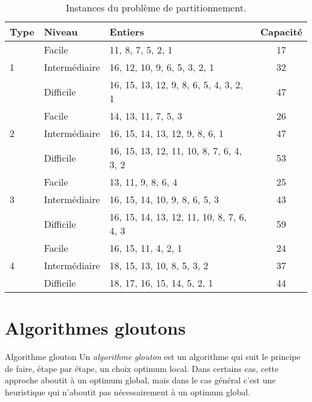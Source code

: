 \documentclass[11pt]{article}
\newcommand{\TabularInstances}[1]{%
  \begin{tabular}{lllc}
    \toprule
    Type & Niveau & Entiers & Capacité
    \ifthenelse{\equal{#1}{1} \OR \equal{#1}{0}}{%
    \\ \midrule
         & Facile & 11, 8, 7, 5, 2, 1 & 17 \\
    1 & Intermédiaire & 16, 12, 10, 9, 6, 5, 3, 2, 1 & 32 \\
         & Difficile & 16, 15, 13, 12, 9, 8, 6, 5, 4, 3, 2, 1 & 47
  }{}
  \ifthenelse{\equal{#1}{2} \OR \equal{#1}{0}}{%
    \\ \midrule
         & Facile & 14, 13, 11, 7, 5, 3 & 26 \\
    2 & Intermédiaire & 16, 15, 14, 13, 12, 9, 8, 6, 1 & 47 \\
         & Difficile & 16, 15, 13, 12, 11, 10, 8, 7, 6, 4, 3, 2 & 53
    }{}
    \ifthenelse{\equal{#1}{3} \OR \equal{#1}{0}}{%
    \\ \midrule
         & Facile & 13, 11, 9, 8, 6, 4 & 25 \\
    3 & Intermédiaire & 16, 15, 14, 10, 9, 8, 6, 5, 3 & 43 \\
         & Difficile & 16, 15, 14, 13, 12, 11, 10, 8, 7, 6, 4, 3 & 59
    }{}
    \ifthenelse{\equal{#1}{4} \OR \equal{#1}{0}}{%
    \\ \midrule
         & Facile & 16, 15, 11, 4, 2, 1 & 24 \\
    4 & Intermédiaire & 18, 15, 13, 10, 8, 5, 3, 2 & 37 \\
         & Difficile & 18, 17, 16, 15, 14, 5, 2, 1 & 44
    }{}
    \\ \bottomrule
  \end{tabular}
}
\begin{document}
\begin{table}[htbp]
  \centering
  \TabularInstances{0}
  \caption{Instances du problème de partitionnement.}
  \label{tab:instances}
\end{table}

    \section{Algorithmes gloutons}

  \begin{definition}{Algorithme glouton}
    Un \emph{algorithme glouton} est un algorithme qui suit le principe de faire, étape par étape, un choix optimum local.
    Dans certains cas, cette approche aboutit à un optimum global, mais dans le cas général c'est une heuristique qui n'aboutit pas nécessairement à un optimum global.
  \end{definition}
\end{document}
